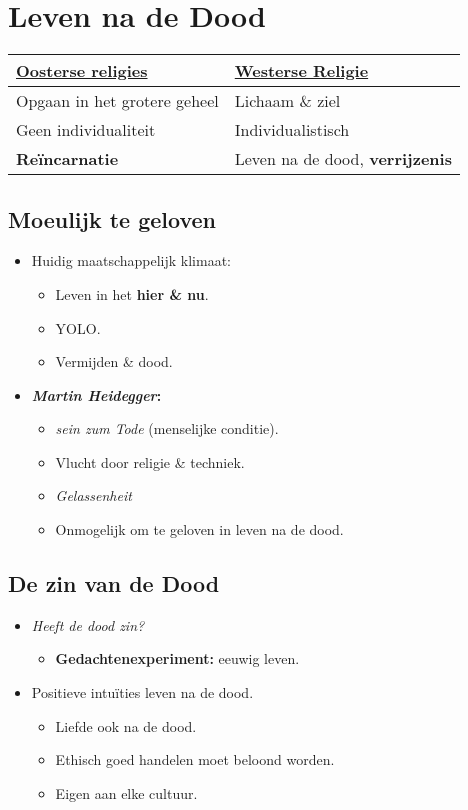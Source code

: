 \section{Leven na de Dood}

\begin{table}[h]
	\centering
	\begin{tabular}{| p{} | p{}|}
		\hline 
		\textbf{\underline{Oosterse religies}} & \textbf{\underline{Westerse Religie}} 
		\\ \hline
		Opgaan in het grotere geheel & Lichaam \& ziel
		\\ \hline
		Geen individualiteit & Individualistisch
		\\ \hline
		\textbf{Re\"incarnatie} & Leven na de dood, \textbf{verrijzenis}
		\\ \hline
	\end{tabular}
\end{table}

\subsection*{Moeulijk te geloven}
\begin{itemize}
	\item Huidig maatschappelijk klimaat:
	\begin{itemize}
		\item Leven in het \textbf{hier \& nu}.
		\item YOLO.
		\item Vermijden \& dood.
	\end{itemize}
	\item \textbf{\textit{Martin Heidegger}:}
	\begin{itemize}
		\item \textit{sein zum Tode} (menselijke conditie).
		\item Vlucht door religie \& techniek.
		\item \textit{Gelassenheit}
		\item Onmogelijk om te geloven in leven na de dood.
	\end{itemize}
\end{itemize}

\subsection*{De zin van de Dood}
\begin{itemize}
	\item \textit{Heeft de dood zin?}
	\begin{itemize}
		\item \textbf{Gedachtenexperiment:} eeuwig leven.
	\end{itemize}
	\item Positieve intu\"ities leven na de dood.
	\begin{itemize}
		\item Liefde ook na de dood.
		\item Ethisch goed handelen moet beloond worden.
		\item Eigen aan elke cultuur.
	\end{itemize}
\end{itemize}
